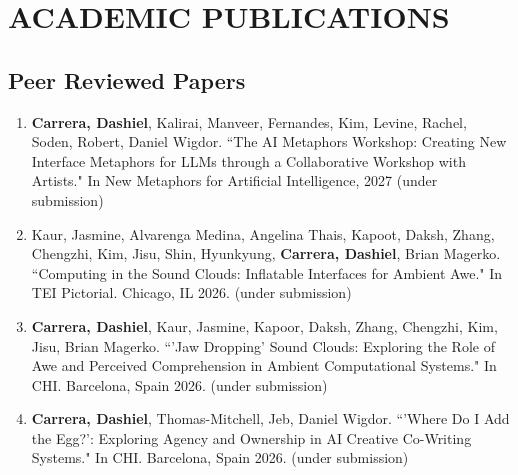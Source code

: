 \section{ACADEMIC PUBLICATIONS}

\subsection{Peer Reviewed Papers}
 \begin{enumerate}
  
\item \textbf{Carrera, Dashiel}, Kalirai, Manveer, Fernandes, Kim, Levine, Rachel, Soden, Robert, Daniel Wigdor. ``The AI Metaphors Workshop: Creating New Interface Metaphors for LLMs through a Collaborative Workshop with Artists." In New Metaphors for Artificial Intelligence, 2027 (under submission) \\

\item Kaur, Jasmine, Alvarenga Medina, Angelina Thais, Kapoot, Daksh, Zhang, Chengzhi, Kim, Jisu, Shin, Hyunkyung, \textbf{Carrera, Dashiel}, Brian Magerko. ``Computing in the Sound Clouds: Inflatable Interfaces for Ambient Awe." In TEI Pictorial. Chicago, IL 2026. (under submission) \\

   \item \textbf{Carrera, Dashiel}, Kaur, Jasmine, Kapoor, Daksh, Zhang, Chengzhi, Kim, Jisu, Brian Magerko. ``'Jaw Dropping' Sound Clouds: Exploring the Role of Awe and Perceived Comprehension in Ambient Computational Systems." In CHI. Barcelona, Spain 2026. (under submission) \\
 
  \item \textbf{Carrera, Dashiel}, Thomas-Mitchell, Jeb, Daniel Wigdor. ``'Where Do I Add the Egg?': Exploring Agency and Ownership in AI Creative Co-Writing Systems." In CHI. Barcelona, Spain 2026. (under submission) \\
  

\end{enumerate}
